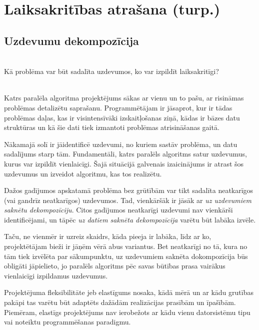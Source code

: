 
\section{Laiksakritības atrašana (turp.)}
\subsection{Uzdevumu dekompozīcija}

\\
Kā problēma var būt sadalīta uzdevumos, ko var izpildīt laiksakritīgi?

\noindent{}\\
Katrs paralēla algoritma projektējums sākas ar vienu un to pašu, ar risināmas
problēmas detalizētu saprašanu. Programmētājam ir jāsaprot, kur ir tādas problēmas
daļas, kas ir visintensīvāki izskaitļošanas ziņā, kādas ir bāzes datu struktūras
un kā šie dati tiek izmantoti problēmas atrisināšanas gaitā.

Nākamajā solī ir jāidentificē uzdevumi, no kuriem sastāv problēma, un datu
sadalījums starp tām. Fundamentāli, katrs paralēls algoritms satur uzdevumus,
kurus var izpildīt vienlaicīgi. Šajā situācijā galvenais izaicinājums ir atrast
šos uzdevumus un izveidot algoritmu, kas tos realizētu.

Dažos gadījumos apskatamā problēma bez grūtībām var tikt sadalīta neatkarīgos
(vai gandrīz neatkarīgos) uzdevumos. Tad, vienkāršāk ir jāsāk ar \emph{uz uzdevumiem
saknētu dekompozīciju}. Citos gadījumos neatkarīgi uzdevumi nav vienkārši
identificējami, un tāpēc \emph{uz datiem saknēta dekompozīcija} varētu būt labāka
izvēle.

Taču, ne vienmēr ir uzreiz skaidrs, kāda pieeja ir labāka, līdz ar ko,
projektētājam bieži ir jāņēm vērā abus variantus. Bet neatkarīgi no tā, kura no tām
tiek izvēlēta par sākumpunktu, uz uzdevumiem saknēta dokompozīcija būs obligāti
jāpielieto, jo paralēls algoritms pēc savas būtības prasa vairākus vienlaicīgi
izpildamus uzdevumus.

\noindent{}
\begin{dotlist}
	\item {} Projektējuma fleksibilitāte jeb elastīgums
		nosaka, kādā mērā un ar kādu grutības pakāpi tas varētu būt
		adaptēts dažādām realizācijas prasībām un īpašībām. Piemēram,
		elastīgs projektējums nav ierobežots ar kādu vienu datorsistēmu
		tipu vai noteiktu programmēšanas paradigmu.
	\item {}
	\item {}
\end{dotlist}

